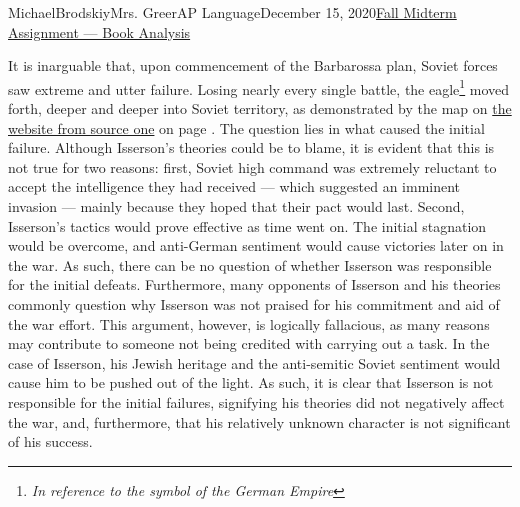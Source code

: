 \documentclass[12pt,letterpaper]{article}
\begin{document}
\begin{mla}{Michael}{Brodskiy}{Mrs. Greer}{AP Language}{December 15, 2020}{\underline{Fall Midterm Assignment — Book Analysis}}
  \begin{justify}
    \vspace{-12pt}\quad It is inarguable that, upon commencement of the Barbarossa plan, Soviet forces saw extreme and utter failure. Losing nearly every single battle, the eagle\footnote{\textit{In reference to the symbol of the German Empire}} moved forth, deeper and deeper into Soviet territory, as demonstrated by the map on \href{English.Pobediteli.ru}{the website from source one} on page \pageref{LastPage}.  The question lies in what caused the initial failure. Although Isserson's theories could be to blame, it is evident that this is not true for two reasons: first, Soviet high command was extremely reluctant to accept the intelligence they had received — which suggested an imminent invasion — mainly because they hoped that their pact would last. Second, Isserson's tactics would prove effective as time went on. The initial stagnation would be overcome, and anti-German sentiment would cause victories later on in the war. As such, there can be no question of whether Isserson was responsible for the initial defeats. Furthermore, many opponents of Isserson and his theories commonly question why Isserson was not praised for his commitment and aid of the war effort. This argument, however, is logically fallacious, as many reasons may contribute to someone not being credited with carrying out a task. In the case of Isserson, his Jewish heritage and the anti-semitic Soviet sentiment would cause him to be pushed out of the light. As such, it is clear that Isserson is not responsible for the initial failures, signifying his theories did not negatively affect the war, and, furthermore, that his relatively unknown character is not significant of his success.
  \end{justify}


\end{mla}
\end{document}
